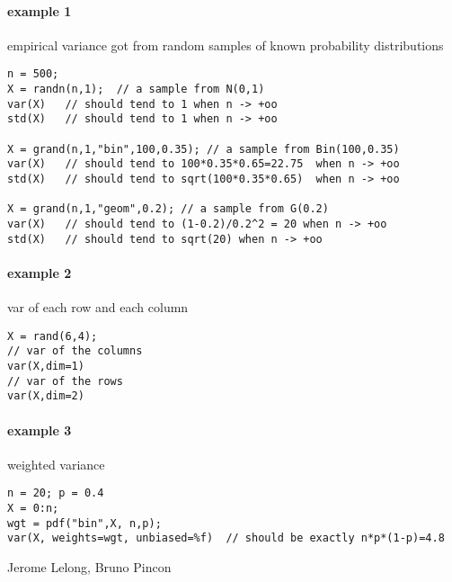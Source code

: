 \begin{examples}
\paragraph{example 1} empirical variance got from random samples of known probability distributions 
\begin{Verbatim}
n = 500;
X = randn(n,1);  // a sample from N(0,1)
var(X)   // should tend to 1 when n -> +oo
std(X)   // should tend to 1 when n -> +oo

X = grand(n,1,"bin",100,0.35); // a sample from Bin(100,0.35)
var(X)   // should tend to 100*0.35*0.65=22.75  when n -> +oo
std(X)   // should tend to sqrt(100*0.35*0.65)  when n -> +oo

X = grand(n,1,"geom",0.2); // a sample from G(0.2)
var(X)   // should tend to (1-0.2)/0.2^2 = 20 when n -> +oo
std(X)   // should tend to sqrt(20) when n -> +oo
\end{Verbatim}

\paragraph{example 2} var of each row and each column
\begin{Verbatim}
X = rand(6,4);
// var of the columns
var(X,dim=1)
// var of the rows
var(X,dim=2)
\end{Verbatim}

\paragraph{example 3} weighted variance
\begin{Verbatim}
n = 20; p = 0.4
X = 0:n;
wgt = pdf("bin",X, n,p);
var(X, weights=wgt, unbiased=%f)  // should be exactly n*p*(1-p)=4.8
\end{Verbatim}


\end{examples}

\begin{manseealso}
\end{manseealso}

\begin{authors}
  Jerome Lelong, Bruno Pincon
\end{authors}
